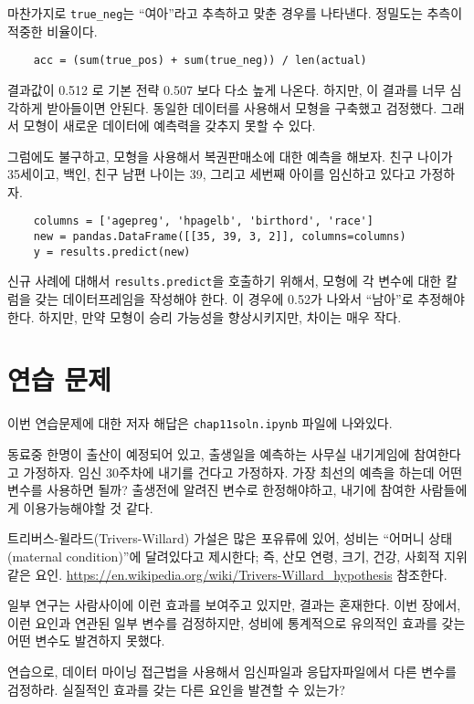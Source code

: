 마찬가지로 \verb"true_neg"는 ``여아''라고 추측하고 맞춘 경우를 나타낸다. 정밀도는 추측이 적중한 비율이다.

\begin{verbatim}
    acc = (sum(true_pos) + sum(true_neg)) / len(actual)
\end{verbatim}

결과값이 0.512 로 기본 전략 0.507 보다 다소 높게 나온다.
하지만, 이 결과를 너무 심각하게 받아들이면 안된다. 
동일한 데이터를 사용해서 모형을 구축했고 검정했다.
그래서 모형이 새로운 데이터에 예측력을 갖추지 못할 수 있다.

그럼에도 불구하고, 모형을 사용해서 복권판매소에 대한 예측을 해보자.
친구 나이가 35세이고, 백인, 친구 남편 나이는 39, 그리고 세번째 아이를 임신하고 있다고 가정하자.

\begin{verbatim}
    columns = ['agepreg', 'hpagelb', 'birthord', 'race']
    new = pandas.DataFrame([[35, 39, 3, 2]], columns=columns)
    y = results.predict(new)
\end{verbatim}

신규 사례에 대해서 {\tt results.predict}을 호출하기 위해서, 
모형에 각 변수에 대한 칼럼을 갖는 데이터프레임을 작성해야 한다. 
이 경우에 0.52가 나와서 ``남아''로 추정해야 한다. 하지만, 만약 모형이 승리 가능성을 향상시키지만, 차이는 매우 작다.


\section{연습 문제}

이번 연습문제에 대한 저자 해답은 \verb"chap11soln.ipynb" 파일에 나와있다.

\begin{exercise}
동료중 한명이 출산이 예정되어 있고, 출생일을 예측하는 사무실 내기게임에 참여한다고 가정하자. 임신 30주차에 내기를 건다고 가정하자. 가장 최선의 예측을 하는데 어떤 변수를 사용하면 될까? 출생전에 알려진 변수로 한정해야하고, 내기에 참여한 사람들에게 이용가능해야할 것 같다.

\end{exercise}


\begin{exercise}
트리버스-윌라드(Trivers-Willard) 가설은 많은 포유류에 있어, 성비는 
``어머니 상태(maternal condition)''에 달려있다고 제시한다; 즉,
산모 연령, 크기, 건강, 사회적 지위 같은 요인.
\url{https://en.wikipedia.org/wiki/Trivers-Willard_hypothesis} 참조한다.


일부 연구는 사람사이에 이런 효과를 보여주고 있지만, 결과는 혼재한다.
이번 장에서, 이런 요인과 연관된 일부 변수를 검정하지만, 
성비에 통계적으로 유의적인 효과를 갖는 어떤 변수도 발견하지 못했다.
   

연습으로, 데이터 마이닝 접근법을 사용해서 임신파일과 응답자파일에서 
다른 변수를 검정하라. 실질적인 효과를 갖는 다른 요인을 발견할 수 있는가?


\end{exercise}



